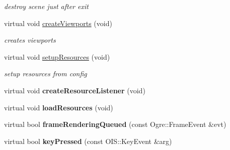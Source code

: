 \begin{DoxyCompactItemize}
\begin{DoxyCompactList}\small\item\em destroy scene just after exit \end{DoxyCompactList}\item 
\hypertarget{class_whitedrop_1_1_whitedrop_engine_a448668f558488d0c687edf25f24f4489}{virtual void \hyperlink{class_whitedrop_1_1_whitedrop_engine_a448668f558488d0c687edf25f24f4489}{create\+Viewports} (void)}\label{class_whitedrop_1_1_whitedrop_engine_a448668f558488d0c687edf25f24f4489}

\begin{DoxyCompactList}\small\item\em creates viewports \end{DoxyCompactList}\item 
\hypertarget{class_whitedrop_1_1_whitedrop_engine_a689ea03f88f536b3bf117aa50a475845}{virtual void \hyperlink{class_whitedrop_1_1_whitedrop_engine_a689ea03f88f536b3bf117aa50a475845}{setup\+Resources} (void)}\label{class_whitedrop_1_1_whitedrop_engine_a689ea03f88f536b3bf117aa50a475845}

\begin{DoxyCompactList}\small\item\em setup resources from config \end{DoxyCompactList}\item 
\hypertarget{class_whitedrop_1_1_whitedrop_engine_a5e79247b175fc16a1359126df19ac19a}{virtual void {\bfseries create\+Resource\+Listener} (void)}\label{class_whitedrop_1_1_whitedrop_engine_a5e79247b175fc16a1359126df19ac19a}

\item 
\hypertarget{class_whitedrop_1_1_whitedrop_engine_a6155895a22f2f7bd00c3cd02547ed93f}{virtual void {\bfseries load\+Resources} (void)}\label{class_whitedrop_1_1_whitedrop_engine_a6155895a22f2f7bd00c3cd02547ed93f}

\item 
\hypertarget{class_whitedrop_1_1_whitedrop_engine_a956820f01437e37b1123cb76829caa89}{virtual bool {\bfseries frame\+Rendering\+Queued} (const Ogre\+::\+Frame\+Event \&evt)}\label{class_whitedrop_1_1_whitedrop_engine_a956820f01437e37b1123cb76829caa89}

\item 
\hypertarget{class_whitedrop_1_1_whitedrop_engine_a83598f28ed85040c8b11cd1d869e73ce}{virtual bool {\bfseries key\+Pressed} (const O\+I\+S\+::\+Key\+Event \&arg)}\label{class_whitedrop_1_1_whitedrop_engine_a83598f28ed85040c8b11cd1d869e73ce}


\end{DoxyCompactItemize}
